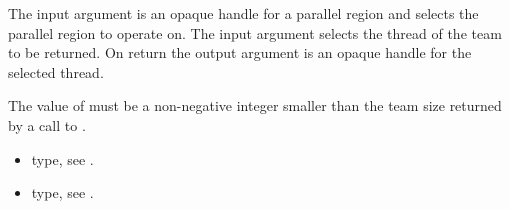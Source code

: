 \argdesc
The input argument  is an opaque handle for a parallel region
 and selects the parallel region to operate on.
The input argument  selects the thread of the team to be returned. 
On return the output argument  is an opaque handle for the selected thread.

\restrictions
The value of  must be a non-negative integer smaller than the
team size returned by a call to .

\crossreferences
\begin{itemize}
	\item {} type, see .
	\item {} type, see .
\end{itemize}

%
%
%
%
%
%
%


